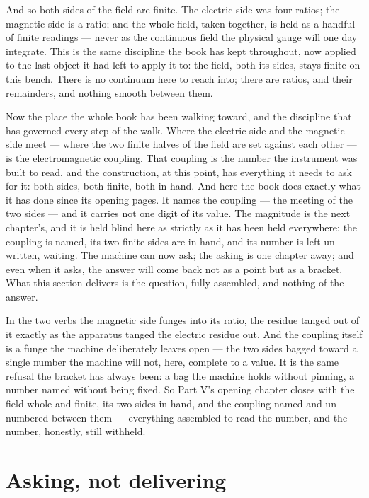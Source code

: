 And so both sides of the field are finite. The electric side was four ratios; the magnetic side is a ratio; and the
whole field, taken together, is held as a handful of finite readings --- never as the continuous field the physical
gauge will one day integrate. This is the same discipline the book has kept throughout, now applied to the last object
it had left to apply it to: the field, both its sides, stays finite on this bench. There is no continuum here to reach
into; there are ratios, and their remainders, and nothing smooth between them.

Now the place the whole book has been walking toward, and the discipline that has governed every step of the walk.
Where the electric side and the magnetic side meet --- where the two finite halves of the field are set against each
other --- is the electromagnetic coupling. That coupling is the number the instrument was built to read, and the
construction, at this point, has everything it needs to ask for it: both sides, both finite, both in hand. And here the
book does exactly what it has done since its opening pages. It names the coupling --- the meeting of the two sides ---
and it carries not one digit of its value. The magnitude is the next chapter's, and it is held blind here as strictly
as it has been held everywhere: the coupling is named, its two finite sides are in hand, and its number is left
un-written, waiting. The machine can now ask; the asking is one chapter away; and even when it asks, the answer will
come back not as a point but as a bracket. What this section delivers is the question, fully assembled, and nothing of
the answer.

In the two verbs the magnetic side funges into its ratio, the residue tanged out of it exactly as the apparatus tanged
the electric residue out. And the coupling itself is a funge the machine deliberately leaves open --- the two sides
bagged toward a single number the machine will not, here, complete to a value. It is the same refusal the bracket has
always been: a bag the machine holds without pinning, a number named without being fixed. So Part V's opening chapter
closes with the field whole and finite, its two sides in hand, and the coupling named and un-numbered between them ---
everything assembled to read the number, and the number, honestly, still withheld.

\section{Asking, not delivering}

